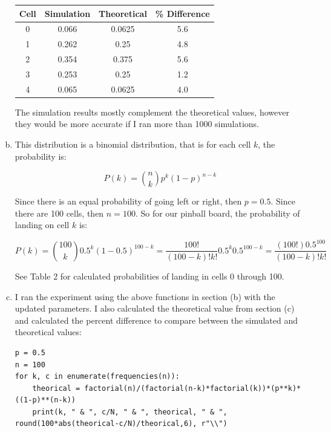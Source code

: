 \documentclass[11pt]{extarticle}
\begin{document}
\begin{enumerate}[(a)]
\begin{table}[ht!]
\centering
\begin{tabular}{cccc}
\toprule
\textbf{Cell} & \textbf{Simulation} & \textbf{Theoretical} & \textbf{\% Difference} \\
\midrule
0  &  0.066  &  0.0625  &  5.6 \\
1  &  0.262  &  0.25  &  4.8 \\
2  &  0.354  &  0.375  &  5.6 \\
3  &  0.253  &  0.25  &  1.2 \\
4  &  0.065  &  0.0625  &  4.0 \\
\toprule
\end{tabular}
\end{table}

The simulation results mostly complement the theoretical values, however they would be more accurate if I ran more than 1000 simulations.

\item This distribution is a binomial distribution, that is for each cell $k$, the probability is:

$$ P(k) = {n \choose k} p^k (1-p)^{n-k} $$

Since there is an equal probability of going left or right, then $p=0.5$. Since there are 100 cells, then $n=100$. So for our pinball board, the probability of landing on cell $k$ is:

$$ P(k) = {100 \choose k} 0.5^k (1 - 0.5)^{100-k}  = \frac{100!}{(100-k)! k!} 0.5^k 0.5^{100-k} = \frac{(100!) 0.5^{100}}{(100-k)! k!} $$

See Table 2 for calculated probabilities of landing in cells 0 through 100.


\item I ran the experiment using the above functions in section (b) with the updated parameters. I also calculated the theoretical value from section (c) and calculated the percent difference to compare between the simulated and theoretical values:

\scriptsize
\begin{verbatim}
p = 0.5
n = 100
for k, c in enumerate(frequencies(n)):
    theorical = factorial(n)/(factorial(n-k)*factorial(k))*(p**k)*((1-p)**(n-k))
    print(k, " & ", c/N, " & ", theorical, " & ", round(100*abs(theorical-c/N)/theorical,6), r"\\")
\end{verbatim}
\normalsize





\end{enumerate}
\end{document}
